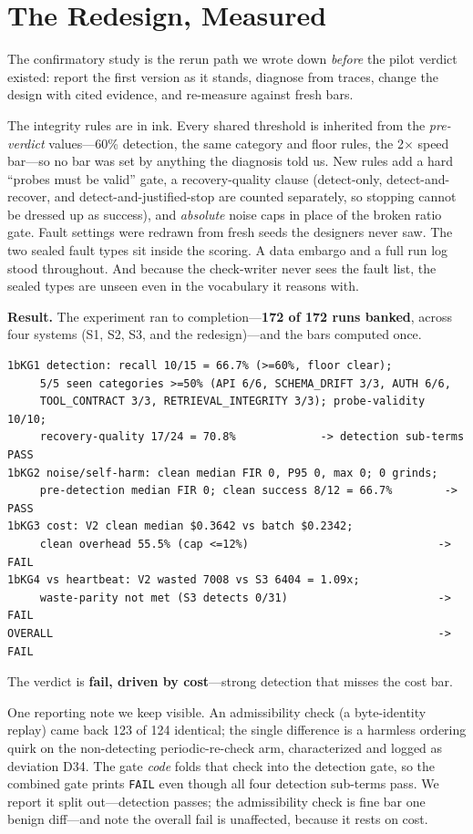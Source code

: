 \documentclass[acmsmall,screen]{acmart}
\begin{document}
\section{The Redesign, Measured}
The confirmatory study is the rerun path we wrote down \emph{before} the pilot
verdict existed: report the first version as it stands, diagnose from traces,
change the design with cited evidence, and re-measure against fresh bars.

The integrity rules are in ink. Every shared threshold is inherited from the
\emph{pre-verdict} values---60\% detection, the same category and floor rules,
the 2$\times$ speed bar---so no bar was set by anything the diagnosis told us.
New rules add a hard ``probes must be valid'' gate, a recovery-quality clause
(detect-only, detect-and-recover, and detect-and-justified-stop are counted
separately, so stopping cannot be dressed up as success), and \emph{absolute}
noise caps in place of the broken ratio gate. Fault settings were redrawn from
fresh seeds the designers never saw. The two sealed fault types sit inside the
scoring. A data embargo and a full run log stood throughout. And because the
check-writer never sees the fault list, the sealed types are unseen even in the
vocabulary it reasons with.

\textbf{Result.} The experiment ran to completion---\textbf{172 of 172 runs
banked}, across four systems (S1, S2, S3, and the redesign)---and the bars
computed once.

\begin{lstlisting}
1bKG1 detection: recall 10/15 = 66.7% (>=60%, floor clear);
     5/5 seen categories >=50% (API 6/6, SCHEMA_DRIFT 3/3, AUTH 6/6,
     TOOL_CONTRACT 3/3, RETRIEVAL_INTEGRITY 3/3); probe-validity 10/10;
     recovery-quality 17/24 = 70.8%             -> detection sub-terms PASS
1bKG2 noise/self-harm: clean median FIR 0, P95 0, max 0; 0 grinds;
     pre-detection median FIR 0; clean success 8/12 = 66.7%        -> PASS
1bKG3 cost: V2 clean median $0.3642 vs batch $0.2342;
     clean overhead 55.5% (cap <=12%)                             -> FAIL
1bKG4 vs heartbeat: V2 wasted 7008 vs S3 6404 = 1.09x;
     waste-parity not met (S3 detects 0/31)                       -> FAIL
OVERALL                                                           -> FAIL
\end{lstlisting}

The verdict is \textbf{fail, driven by cost}---strong detection that misses the
cost bar.

One reporting note we keep visible. An admissibility check (a byte-identity
replay) came back 123 of 124 identical; the single difference is a harmless
ordering quirk on the non-detecting periodic-re-check arm, characterized and
logged as deviation D34. The gate \emph{code} folds that check into the
detection gate, so the combined gate prints \texttt{FAIL} even though all four
detection sub-terms pass. We report it split out---detection passes; the
admissibility check is fine bar one benign diff---and note the overall fail is
unaffected, because it rests on cost.
\end{document}
